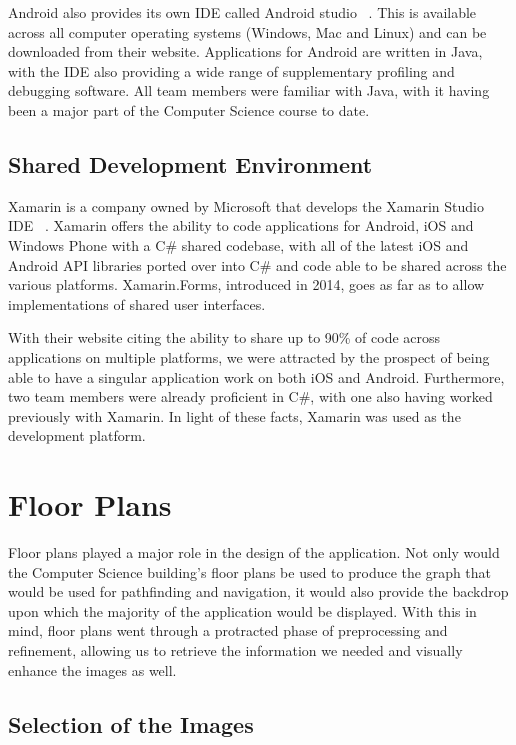 \documentclass[12pt,a4paper]{report}
\begin{document}
Android also provides its own IDE called Android studio ~\cite{androidStudio}. This is available across all computer operating systems (Windows, Mac and Linux) and can be downloaded from their website. Applications for Android are written in Java, with the IDE also providing a wide range of supplementary profiling and debugging software. All team members were familiar with Java, with it having been a major part of the Computer Science course to date.

\subsection{Shared Development Environment}

Xamarin is a company owned by Microsoft that develops the Xamarin Studio IDE ~\cite{xamarin}. Xamarin offers the ability to code applications for Android, iOS and Windows Phone with a C\# shared codebase, with all of the latest iOS and Android API libraries ported over into C\# and code able to be shared across the various platforms. Xamarin.Forms, introduced in 2014, goes as far as to allow implementations of shared user interfaces.

With their website citing the ability to share up to 90\% of code across applications on multiple platforms, we were attracted by the prospect of being able to have a singular application work on both iOS and Android. Furthermore, two team members were already proficient in C\#, with one also having worked previously with Xamarin. In light of these facts, Xamarin was used as the development platform.

\section{Floor Plans}
\label{sec:floorPlans}
Floor plans played a major role in the design of the application. Not only would the Computer Science building's floor plans be used to produce the graph that would be used for pathfinding and navigation, it would also provide the backdrop upon which the majority of the application would be displayed. With this in mind, floor plans went through a protracted phase of preprocessing and refinement, allowing us to retrieve the information we needed and visually enhance the images as well.

\subsection{Selection of the Images}
\end{document}

